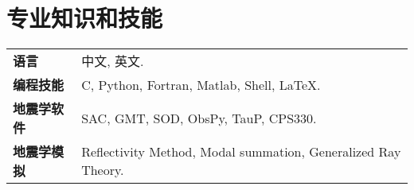 \section*{专业知识和技能}

\begin{tabular}{p{} p{}}
\textbf{语言} & 中文, 英文. \\
\textbf{编程技能} & C, Python, Fortran, Matlab, Shell, LaTeX. \\
\textbf{地震学软件} & SAC, GMT, SOD, ObsPy, TauP, CPS330. \\
\textbf{地震学模拟} & Reflectivity Method, Modal summation, Generalized Ray Theory.\\
\end{tabular}
